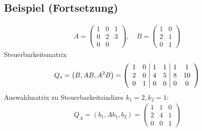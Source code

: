 \documentclass[ngerman]{tudscrreprt}
\begin{document}
\subsection*{Beispiel (Fortsetzung)}
\begin{align*}
A = \begin{pmatrix}
1 & 0 & 1\\ 0 & 2 & 3\\ 0 & 0 & \end{pmatrix}, \quad B = \begin{pmatrix} 1 & 0\\ 2 & 1\\ 0 & 1\end{pmatrix}
\end{align*}
Steuerbarkeitsmatrix \begin{align*}
Q_s = \left( B, AB, A^2B \right) = \left( \begin{array}{ c | c | c }
\begin{matrix} 1 & 0\\ 2 & 0\\ 0 & 1\end{matrix} & \begin{matrix} 1 & 1 \\ 4 & 5\\ 0& 0 \end{matrix} & \begin{matrix} 1 & 1\\ 8 & 10\\ 0 & 0 \end{matrix}
\end{array}\right)
\end{align*}
Auswahlmatrix zu Steuerbarkeitsindizes $k_1 = 2, k_2 = 1: $ \begin{align*}
Q_A = (b_1, Ab_1, b_2 ) = \begin{pmatrix} 1 & 1 & 0\\ 2 & 4 & 1\\ 0 & 0 & 1\end{pmatrix} \end{align*}
\end{document}
